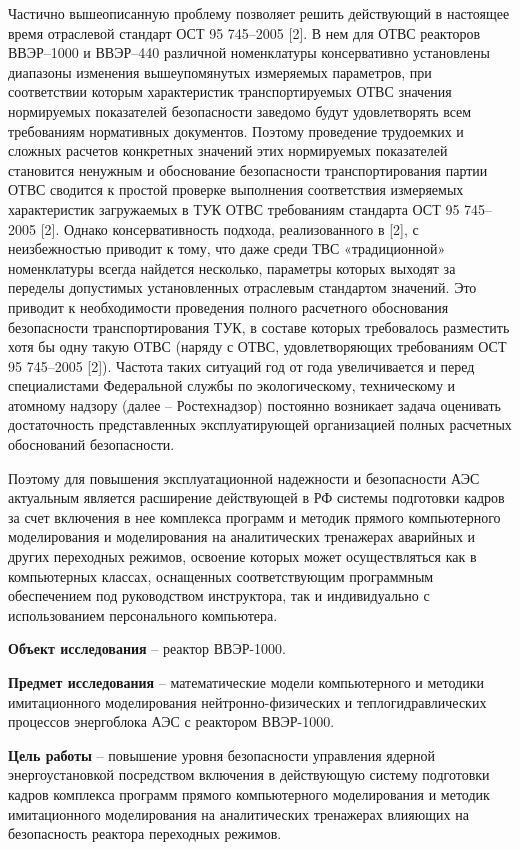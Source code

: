 \documentclass[14pt]{article}
\begin{document}
	Частично вышеописанную проблему позволяет решить действующий в
настоящее время отраслевой стандарт ОСТ 95 745–2005 [2]. В нем для ОТВС
реакторов ВВЭР–1000 и ВВЭР–440 различной номенклатуры консервативно
установлены
диапазоны
изменения
вышеупомянутых
измеряемых
параметров, при соответствии которым характеристик транспортируемых
ОТВС значения нормируемых показателей безопасности заведомо будут
удовлетворять
всем
требованиям
нормативных
документов.
Поэтому
проведение трудоемких и сложных расчетов конкретных значений этих
нормируемых
показателей
становится
ненужным
и
обоснование
безопасности транспортирования партии ОТВС сводится к простой проверке
выполнения соответствия измеряемых характеристик загружаемых в ТУК
ОТВС требованиям стандарта ОСТ 95 745–2005 [2].
Однако
консервативность
подхода,
реализованного
в
[2],
с
неизбежностью приводит к тому, что даже среди ТВС «традиционной»
номенклатуры всегда найдется несколько, параметры которых выходят за
переделы допустимых установленных отраслевым стандартом значений. Это
приводит к необходимости проведения полного расчетного обоснования
безопасности транспортирования ТУК, в составе которых требовалось
разместить хотя бы одну такую ОТВС (наряду с ОТВС, удовлетворяющих
требованиям ОСТ 95 745–2005 [2]). Частота таких ситуаций год от года
увеличивается
и
перед
специалистами
Федеральной
службы
по
экологическому, техническому и атомному надзору (далее – Ростехнадзор)
постоянно возникает задача оценивать достаточность представленных
эксплуатирующей
организацией
полных
расчетных
обоснований
безопасности.

Поэтому для повышения эксплуатационной надежности и безопасности
АЭС актуальным является расширение действующей в РФ системы подготовки
кадров за счет включения в нее комплекса программ и методик прямого
компьютерного моделирования и моделирования на аналитических тренажерах
аварийных
и
других
переходных
режимов,
освоение
которых
может
осуществляться как в компьютерных классах, оснащенных соответствующим
программным обеспечением под руководством инструктора, так и индивидуально
с использованием персонального компьютера.

\textbf{Объект исследования} – реактор ВВЭР-1000.

\textbf{Предмет исследования} – математические модели компьютерного и
методики
имитационного
моделирования
нейтронно-физических
и
теплогидравлических процессов энергоблока АЭС с реактором ВВЭР-1000.

\textbf{Цель работы} – повышение уровня безопасности управления ядерной
энергоустановкой посредством включения в действующую систему подготовки
кадров комплекса программ прямого компьютерного моделирования и методик
имитационного моделирования на аналитических тренажерах влияющих на
безопасность реактора переходных режимов.
	
\end{document}
